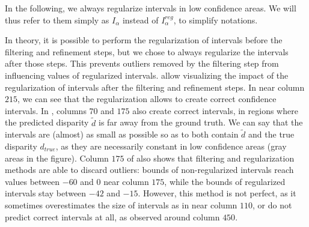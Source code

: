 In the following, we always regularize intervals in low confidence areas. We will thus refer to them simply as $I_\alpha$ instead of $I^{reg}_\alpha$, to simplify notations.

In theory, it is possible to perform the regularization of intervals before the filtering and refinement steps, but we chose to always regularize the intervals after those steps. This prevents outliers removed by the filtering step from influencing values of regularized intervals.  allow visualizing the impact of the regularization of intervals after the filtering and refinement steps. In  near column $215$, we can see that the regularization allows to create correct confidence intervals. In , columns $70$ and $175$ also create correct intervals, in regions where the predicted disparity $\tilde{d}$ is far away from the ground truth. We can say that the intervals are (almost) as small as possible so as to both contain $\tilde{d}$ and the true disparity $d_{true}$, as they are necessarily constant in low confidence areas (gray areas in the figure). Column $175$ of  also shows that filtering and regularization methods are able to discard outliers: bounds of non-regularized intervals reach values between $-60$ and $0$ near column $175$, while the bounds of regularized intervals stay between $-42$ and $-15$. However, this method is not perfect, as it sometimes overestimates the size of intervals as in  near column $110$, or do not predict correct intervals at all, as observed around column $450$.

